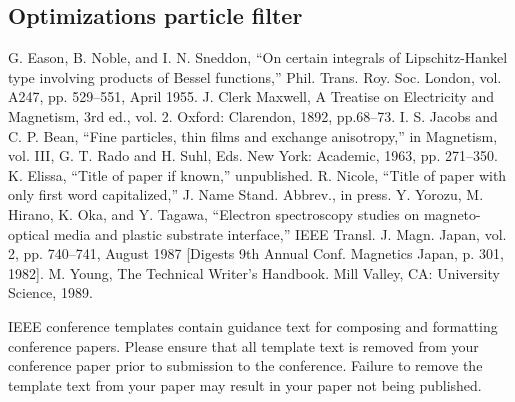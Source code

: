 \documentclass[conference]{IEEEtran}
\begin{document}
\subsection*{Optimizations particle filter}
\begin{thebibliography}{00}
 G. Eason, B. Noble, and I. N. Sneddon, ``On certain integrals of Lipschitz-Hankel type involving products of Bessel functions,'' Phil. Trans. Roy. Soc. London, vol. A247, pp. 529--551, April 1955.
 J. Clerk Maxwell, A Treatise on Electricity and Magnetism, 3rd ed., vol. 2. Oxford: Clarendon, 1892, pp.68--73.
 I. S. Jacobs and C. P. Bean, ``Fine particles, thin films and exchange anisotropy,'' in Magnetism, vol. III, G. T. Rado and H. Suhl, Eds. New York: Academic, 1963, pp. 271--350.
 K. Elissa, ``Title of paper if known,'' unpublished.
 R. Nicole, ``Title of paper with only first word capitalized,'' J. Name Stand. Abbrev., in press.
 Y. Yorozu, M. Hirano, K. Oka, and Y. Tagawa, ``Electron spectroscopy studies on magneto-optical media and plastic substrate interface,'' IEEE Transl. J. Magn. Japan, vol. 2, pp. 740--741, August 1987 [Digests 9th Annual Conf. Magnetics Japan, p. 301, 1982].
 M. Young, The Technical Writer's Handbook. Mill Valley, CA: University Science, 1989.
\end{thebibliography}
\vspace{12pt}
\color{red}
IEEE conference templates contain guidance text for composing and formatting conference papers. Please ensure that all template text is removed from your conference paper prior to submission to the conference. Failure to remove the template text from your paper may result in your paper not being published.
\end{document}
